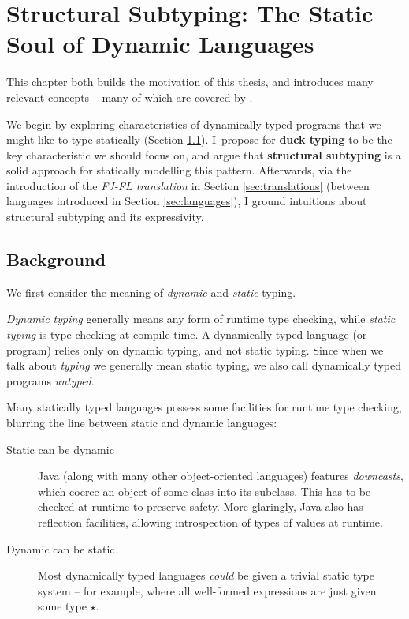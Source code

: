 \chapter
    [Structural Subtyping: The Static Soul of Dynamic Languages]
    {Structural Subtyping: \newline The Static Soul of Dynamic Languages}
\label{static-soul}

This chapter both builds the motivation of this thesis, and introduces many relevant concepts -- many of which are covered by \textcite{tapl}.

We begin by exploring characteristics of dynamically typed programs that we might like to type statically (Section \ref{sec:ch2background}). I~propose for \textbf{duck typing} to be the key characteristic we should focus on, and argue that \textbf{structural subtyping} is a solid approach for statically modelling this pattern. Afterwards, via the introduction of the \emph{FJ-FL translation} in Section \ref{sec:translations} (between languages introduced in Section \ref{sec:languages}), I ground intuitions about structural subtyping and its expressivity.

\section{Background}
\label{sec:ch2background}

We first consider the meaning of \emph{dynamic} and \emph{static} typing.

\emph{Dynamic typing} generally means any form of runtime type checking, while \emph{static typing} is type checking at compile time. A dynamically typed language (or program) relies only on dynamic typing, and not static typing. Since when we talk about \emph{typing} we generally mean static typing, we also call dynamically typed programs \emph{untyped}.

Many statically typed languages possess some facilities for runtime type checking, blurring the line between static and dynamic languages: \begin{description}
    \item[Static can be dynamic] Java (along with many other object-oriented languages) features \textit{downcasts}, which coerce an object of some class into its subclass. This has to be checked at runtime to preserve safety. 
    More glaringly, Java also has reflection facilities, allowing introspection of types of values at runtime. 
    \item[Dynamic can be static] Most dynamically typed languages \emph{could} be given a trivial static type system -- for example, where all well-formed expressions are just given some type $\star$. 
\end{description} 

